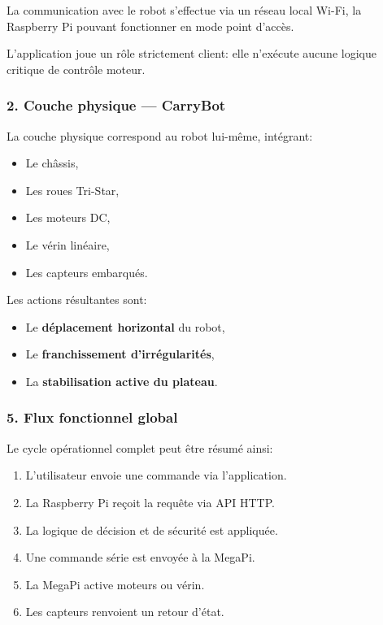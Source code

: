 \documentclass[12pt,a4paper]{article}
\begin{document}
La communication avec le robot s’effectue via un réseau local Wi-Fi,
la Raspberry Pi pouvant fonctionner en mode point d’accès.

L’application joue un rôle strictement client:
elle n’exécute aucune logique critique de contrôle moteur.

\subsubsection*{2. Couche physique — CarryBot}

La couche physique correspond au robot lui-même,
intégrant:

\begin{itemize}
    \item Le châssis,
    \item Les roues Tri-Star,
    \item Les moteurs DC,
    \item Le vérin linéaire,
    \item Les capteurs embarqués.
\end{itemize}

Les actions résultantes sont:

\begin{itemize}
    \item Le \textbf{déplacement horizontal} du robot,
    \item Le \textbf{franchissement d’irrégularités},
    \item La \textbf{stabilisation active du plateau}.
\end{itemize}

\subsubsection*{5. Flux fonctionnel global}

Le cycle opérationnel complet peut être résumé ainsi:

\begin{enumerate}
    \item L’utilisateur envoie une commande via l’application.
    \item La Raspberry Pi reçoit la requête via API HTTP.
    \item La logique de décision et de sécurité est appliquée.
    \item Une commande série est envoyée à la MegaPi.
    \item La MegaPi active moteurs ou vérin.
    \item Les capteurs renvoient un retour d’état.
\end{enumerate}
\end{document}
